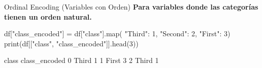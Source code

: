 \documentclass[aspectratio=169, 11pt]{beamer}
\begin{document}
\begin{frame}[fragile,shrink=28]{Ordinal Encoding (Variables con Orden)}
  \vspace{-6pt}
  {\footnotesize\color{arcaDark}\bfseries
    Para variables donde las categorías tienen un orden natural.}

  \vspace{4pt}
  \begin{pyblock}
df["class_encoded"] = df["class"].map(
    {"Third": 1, "Second": 2, "First": 3})
print(df[["class", "class_encoded"]].head(3))
  \end{pyblock}

  \vspace{4pt}
  \begin{outputblock}
    class  class_encoded
0   Third             1
1   First             3
2   Third             1
  \end{outputblock}
\end{frame}
\end{document}
